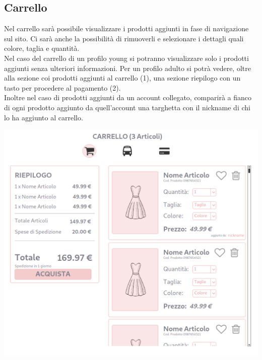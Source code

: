\documentclass[12pt,a4paper]{report}
\begin{document}
\subsection{Carrello}
Nel carrello sarà possibile visualizzare i prodotti aggiunti in fase di navigazione sul sito. Ci sarà anche la possibilità di rimuoverli e selezionare i dettagli quali colore, taglia e quantità.\\
Nel caso del carrello di un profilo young si potranno visualizzare solo i prodotti aggiunti senza ulteriori informazioni. Per un profilo adulto si potrà vedere, oltre alla sezione coi prodotti aggiunti al carrello (1),  una sezione riepilogo con un tasto per procedere al pagamento (2).\\
Inoltre nel caso di prodotti aggiunti da un account collegato, comparirà a fianco di ogni prodotto aggiunto da quell'account una targhetta con il nickname di chi lo ha aggiunto al carrello.
\begin{center}
  \includegraphics[height=0.6\textheight]{"Images Latex/Immagini Wireframe/Desktop/9 - Carrello Genitore"}
\end{center}
\end{document}
